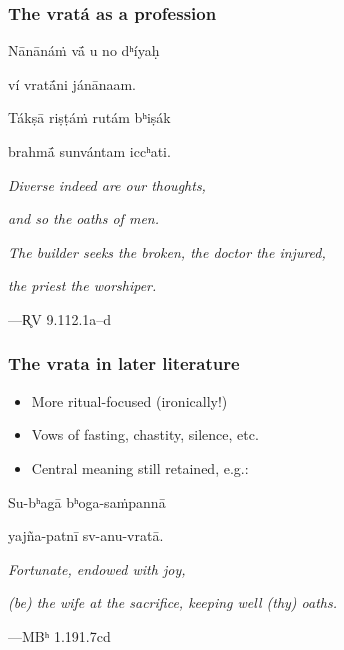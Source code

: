 \documentclass[pdf]{beamer}
\begin{document}
\begin{frame} \frametitle{The vratá as a profession}
\begin{center}
	Nānānáṁ vā́ u no dʰíyaḥ

	ví vratā́ni jánānaam.

	Tákṣā riṣṭáṁ rutám bʰiṣák

	brahmā́ sunvántam iccʰati.

	\vspace{12pt}

	\textit{Diverse indeed are our thoughts,}

	\textit{and so the oaths of men.}

	\textit{The builder seeks the broken, the doctor the injured,}

	\textit{the priest the worshiper.}

	\vspace{12pt}

 	---R̥V 9.112.1a--d
\end{center}
\end{frame}

\begin{frame} \frametitle{The vrata in later literature}
\begin{itemize}
	\item More ritual-focused (ironically!)
	\item Vows of fasting, chastity, silence, etc.
	\item Central meaning still retained, e.g.:
\end{itemize}
\begin{center}
	Su-bʰagā bʰoga-saṁpannā

	yajña-patnī sv-anu-vratā.

	\vspace{12pt}

	\textit{Fortunate, endowed with joy,}

	\textit{(be) the wife at the sacrifice, keeping well (thy) oaths.}

	\vspace{12pt}

 	---MBʰ 1.191.7cd
\end{center}
\end{frame}

\end{document}
